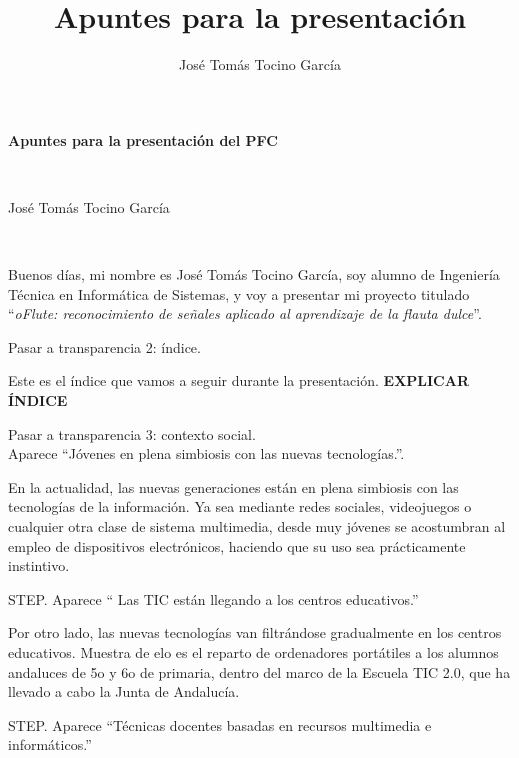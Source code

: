 \documentclass[landscape]{article}
\title{Apuntes para la presentación}
\author{José Tomás Tocino García}
\date{}
\newenvironment{nota}
{%
\begin{framed} \noindent\itshape
}
{%
\end{framed}\vspace{-0.5cm} }
\begin{document}
\pagestyle{empty}
\begin{multicols*}{2}

\begin{center}
  \begin{Large}\textbf{Apuntes para la presentación del PFC}\end{Large}\\
  \begin{large}José Tomás Tocino García\end{large}\\[0.1cm]
\end{center}

Buenos días, mi nombre es José Tomás Tocino García, soy alumno de Ingeniería
Técnica en Informática de Sistemas, y voy a presentar mi proyecto titulado
``\textit{oFlute: reconocimiento de señales aplicado al aprendizaje de la flauta
  dulce}''.

\begin{nota}
  Pasar a transparencia 2: índice.
\end{nota}

Este es el índice que vamos a seguir durante la presentación. \textbf{EXPLICAR
  ÍNDICE}

\begin{nota}
  Pasar a transparencia 3: contexto social. \\Aparece ``Jóvenes en plena simbiosis con
  las nuevas tecnologías.''.
\end{nota}

En la actualidad, las nuevas generaciones están en plena simbiosis con las
tecnologías de la información. Ya sea mediante redes sociales, videojuegos o
cualquier otra clase de sistema multimedia, desde muy jóvenes se acostumbran al
empleo de dispositivos electrónicos, haciendo que su uso sea prácticamente
instintivo.

\begin{nota}
  STEP. Aparece `` Las TIC están llegando a los centros educativos.''
\end{nota}

Por otro lado, las nuevas tecnologías van filtrándose gradualmente en los
centros educativos. Muestra de elo es el reparto de ordenadores portátiles a los
alumnos andaluces de 5o y 6o de primaria, dentro del marco de la Escuela TIC
2.0, que ha llevado a cabo la Junta de Andalucía.

\begin{nota}
  STEP. Aparece ``Técnicas docentes basadas en recursos multimedia e informáticos.''
\end{nota}


\end{multicols*}
\end{document}
